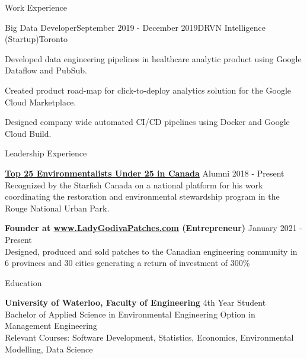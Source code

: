 \documentclass{resume} %
\begin{document}
\begin{rSection}{Work Experience}


\begin{rSubsection}{Big Data Developer}{September 2019 - December 2019}{DRVN Intelligence (Startup)}{Toronto}
\item Developed data engineering pipelines in healthcare analytic product using Google Dataflow and PubSub.
\item Created product road-map for click-to-deploy analytics solution for the Google Cloud Marketplace.
\item Designed company wide automated CI/CD pipelines using Docker and Google Cloud Build.

\end{rSubsection}


\end{rSection}


\begin{rSection}{Leadership Experience}

{\bf \href{https://thestarfish.ca/journal/2018/06/2018-sftop25-finalist-sujeethan-vigneswaran-2}{Top 25 Environmentalists Under 25 in Canada}  } \hfill {Alumni 2018 - Present}\\
Recognized by the Starfish Canada on a national platform for his work coordinating the restoration and environmental stewardship program in the Rouge National Urban Park.

{\bf Founder at \href{www.ladygodivapatches.com}{www.LadyGodivaPatches.com} (Entrepreneur) } \hfill {January 2021 - Present} \\ 
Designed, produced and sold patches to the Canadian engineering community in 6 provinces and 30 cities generating a return of investment of 300\%

\end{rSection}

\begin{rSection}{Education}

{\bf University of Waterloo, Faculty of Engineering} \hfill { 4th Year Student } \\ 
Bachelor of Applied Science in Environmental Engineering Option in Management Engineering \\
Relevant Courses: Software Development, Statistics, Economics, Environmental Modelling, Data Science

\end{rSection}
\end{document}
